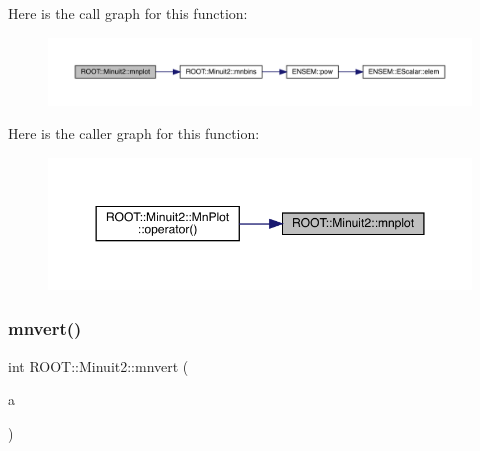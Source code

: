 Here is the call graph for this function\+:
\nopagebreak
\begin{figure}[H]
\begin{center}
\leavevmode
\includegraphics[width=350pt]{d6/d3a/namespaceROOT_1_1Minuit2_a2c786d8330736525f0757ba1848f5bc4_cgraph}
\end{center}
\end{figure}
Here is the caller graph for this function\+:
\nopagebreak
\begin{figure}[H]
\begin{center}
\leavevmode
\includegraphics[width=350pt]{d6/d3a/namespaceROOT_1_1Minuit2_a2c786d8330736525f0757ba1848f5bc4_icgraph}
\end{center}
\end{figure}
\mbox{\label{namespaceROOT_1_1Minuit2_a5e64c8eae56aaee62f3b683068e1148a}} 
\subsubsection{\texorpdfstring{mnvert()}{mnvert()}}
{\footnotesize\ttfamily int R\+O\+O\+T\+::\+Minuit2\+::mnvert (\begin{DoxyParamCaption}\item[{\mbox{\hyperlink{namespaceROOT_1_1Minuit2_a9e74ad97f5537a2e80e52b04d98ecc6e}{Mn\+Algebraic\+Sym\+Matrix}} \&}]{a }\end{DoxyParamCaption})}

